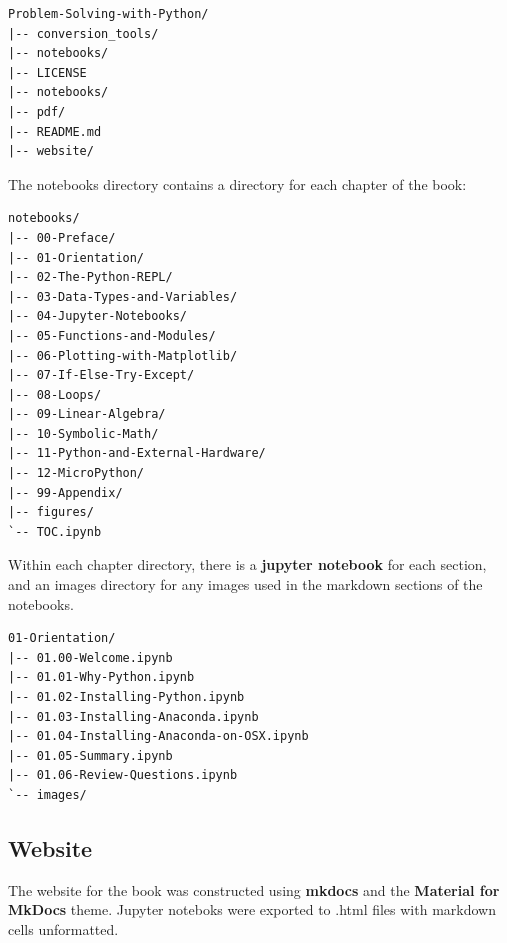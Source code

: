 \documentclass{book}
\begin{document}
    
        \begin{lstlisting}
Problem-Solving-with-Python/
|-- conversion_tools/
|-- notebooks/
|-- LICENSE
|-- notebooks/
|-- pdf/
|-- README.md
|-- website/
\end{lstlisting}
    




    
        The notebooks directory contains a directory for each chapter of the
book:
    




    
        \begin{lstlisting}
notebooks/
|-- 00-Preface/
|-- 01-Orientation/
|-- 02-The-Python-REPL/
|-- 03-Data-Types-and-Variables/
|-- 04-Jupyter-Notebooks/
|-- 05-Functions-and-Modules/
|-- 06-Plotting-with-Matplotlib/
|-- 07-If-Else-Try-Except/
|-- 08-Loops/
|-- 09-Linear-Algebra/
|-- 10-Symbolic-Math/
|-- 11-Python-and-External-Hardware/
|-- 12-MicroPython/
|-- 99-Appendix/
|-- figures/
`-- TOC.ipynb
\end{lstlisting}
    




    
        Within each chapter directory, there is a \textbf{jupyter notebook} for
each section, and an images directory for any images used in the
markdown sections of the notebooks.

\begin{lstlisting}
01-Orientation/
|-- 01.00-Welcome.ipynb
|-- 01.01-Why-Python.ipynb
|-- 01.02-Installing-Python.ipynb
|-- 01.03-Installing-Anaconda.ipynb
|-- 01.04-Installing-Anaconda-on-OSX.ipynb
|-- 01.05-Summary.ipynb
|-- 01.06-Review-Questions.ipynb
`-- images/
\end{lstlisting}
    




    
        \subsection{Website}\label{website}
    




    
        The website for the book was constructed using \textbf{mkdocs} and the
\textbf{Material for MkDocs} theme. Jupyter noteboks were exported to
.html files with markdown cells unformatted.
    
\end{document}
